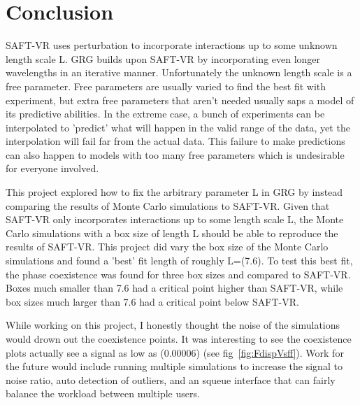 \section{Conclusion}
SAFT-VR uses perturbation to incorporate interactions up to some unknown length scale L. GRG builds upon SAFT-VR by incorporating even longer wavelengths in an iterative manner. Unfortunately the unknown length scale is a free parameter. Free parameters are usually varied to find the best fit with experiment, but extra free parameters that aren't needed usually saps a model of its predictive abilities. In the extreme case, a bunch of experiments can be interpolated to 'predict' what will happen in the valid range of the data, yet the interpolation will fail far from the actual data. This failure to make predictions can also happen to models with too many free parameters which is undesirable for everyone involved.

This project explored how to fix the arbitrary parameter L in GRG by instead comparing the results of Monte Carlo simulations to SAFT-VR. Given that SAFT-VR only incorporates interactions up to some length scale L, the Monte Carlo simulations with a box size of length L should be able to reproduce the results of SAFT-VR. This project did vary the box size of the Monte Carlo simulations and found a 'best' fit length of roughly L=(7.6). To test this best fit, the phase coexistence was found for three box sizes and compared to SAFT-VR. Boxes much smaller than 7.6 had a critical point higher than SAFT-VR, while box sizes much larger than 7.6 had a critical point below SAFT-VR.

While working on this project, I honestly thought the noise of the simulations would drown out the coexistence points. It was interesting to see the coexistence plots actually see a signal as low as (0.00006) (see fig~\ref{fig:FdispVsff}). Work for the future would include running multiple simulations to increase the signal to noise ratio, auto detection of outliers, and an squeue interface that can fairly balance the workload between multiple users.